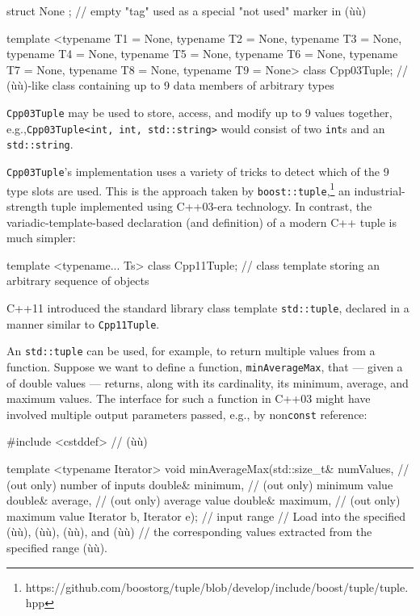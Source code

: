 \begin{emcppslisting}
struct None { };  // empty "tag" used as a special "not used" marker in (ù{}ù)

template <typename T1 = None, typename T2 = None, typename T3 = None,
          typename T4 = None, typename T5 = None, typename T6 = None,
          typename T7 = None, typename T8 = None, typename T9 = None>
class Cpp03Tuple;
    // (ù{}ù)-like class containing up to 9 data members of arbitrary types
\end{emcppslisting}
    

\noindent \lstinline!Cpp03Tuple! may be used to store, access, and modify up to 9
values together, e.g.,\linebreak[4]%
\mbox{\lstinline!Cpp03Tuple<int,!~\lstinline!int,!~\lstinline!std::string>!} would
consist of two \lstinline!int!s and an \lstinline!std::string!.

\lstinline!Cpp03Tuple!'s implementation uses a variety of
 tricks to detect which of the 9 type slots are
used. This is the approach taken by
\lstinline!boost::tuple!,{\cprotect\footnote{https://github.com/boostorg/tuple/blob/develop/include/boost/tuple/tuple.hpp}}
an industrial-strength tuple implemented using C++03-era technology. In
contrast, the variadic-template-based declaration (and definition) of a
modern C++ tuple is much simpler:

\begin{emcppslisting}
template <typename... Ts>
class Cpp11Tuple;  // class template storing an arbitrary sequence of objects
\end{emcppslisting}
    

\noindent C++11 introduced the standard library class template
\lstinline!std::tuple!, declared in a manner similar to
\lstinline!Cpp11Tuple!.

An \lstinline!std::tuple! can be used, for example, to return multiple
values from a function. Suppose we want to define a function,
\lstinline!minAverageMax!, that --- given a  of double values
--- returns, along with its cardinality, its minimum, average, and
maximum values. The interface for such a function in C++03 might have
involved multiple output parameters passed, e.g., by non\lstinline!const!
 reference:

\begin{emcppslisting}
#include <cstddef>  // (ù{}ù)

template <typename Iterator>
void minAverageMax(std::size_t& numValues,   // (out only) number of inputs
                   double& minimum,          // (out only) minimum value
                   double& average,          // (out only) average value
                   double& maximum,          // (out only) maximum value
                   Iterator b, Iterator e);  // input range
    // Load into the specified (ù{}ù), (ù{}ù), (ù{}ù), and (ù{}ù)
    // the corresponding values extracted from the specified range (ù{\codeincomments{[b, e)}}ù).
\end{emcppslisting}
    

